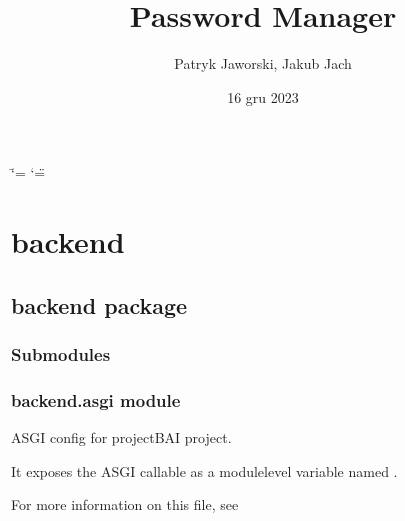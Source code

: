 \documentclass[letterpaper,10pt,polish]{sphinxmanual}
\title{Password Manager}
\date{16 gru 2023}
\author{Patryk Jaworski, Jakub Jach}
\begin{document}
\ifdefined\shorthandoff
  \ifnum\catcode`\=\string=\active\shorthandoff{=}\fi
  \ifnum\catcode`\"=\active{}\fi
\fi

\pagestyle{empty}
\sphinxmaketitle
\pagestyle{plain}
\sphinxtableofcontents
\pagestyle{normal}
\label{\detokenize{index::doc}}


\sphinxstepscope


\chapter{backend}
\label{\detokenize{modules:backend}}\label{\detokenize{modules::doc}}
\sphinxstepscope


\section{backend package}
\label{\detokenize{backend:backend-package}}\label{\detokenize{backend::doc}}

\subsection{Submodules}
\label{\detokenize{backend:submodules}}

\subsection{backend.asgi module}
\label{\detokenize{backend:module-backend.asgi}}\label{\detokenize{backend:backend-asgi-module}}
\sphinxAtStartPar
ASGI config for projectBAI project.

\sphinxAtStartPar
It exposes the ASGI callable as a module\sphinxhyphen{}level variable named .

\sphinxAtStartPar
For more information on this file, see
\end{document}
